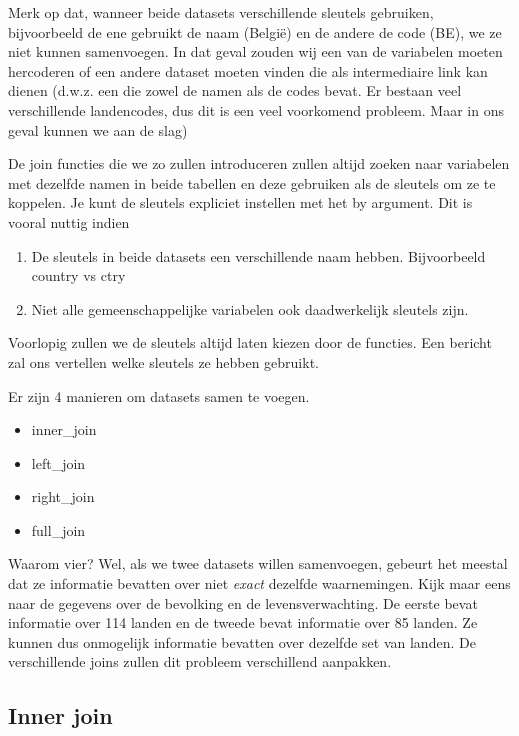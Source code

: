 \documentclass[]{tufte-book}
\providecommand{\tightlist}{%
  \setlength{\itemsep}{0pt}\setlength{\parskip}{0pt}}
\begin{document}
Merk op dat, wanneer beide datasets verschillende sleutels gebruiken, bijvoorbeeld de ene gebruikt de naam (België) en de andere de code (BE), we ze niet kunnen samenvoegen. In dat geval zouden wij een van de variabelen moeten hercoderen of een andere dataset moeten vinden die als intermediaire link kan dienen (d.w.z. een die zowel de namen als de codes bevat. Er bestaan veel verschillende landencodes, dus dit is een veel voorkomend probleem. Maar in ons geval kunnen we aan de slag)

De join functies die we zo zullen introduceren zullen altijd zoeken naar variabelen met dezelfde namen in beide tabellen en deze gebruiken als de sleutels om ze te koppelen. Je kunt de sleutels expliciet instellen met het by argument. Dit is vooral nuttig indien

\begin{enumerate}
\def\labelenumi{\alph{enumi})}
\tightlist
\item
  De sleutels in beide datasets een verschillende naam hebben. Bijvoorbeeld country vs ctry
\item
  Niet alle gemeenschappelijke variabelen ook daadwerkelijk sleutels zijn.
\end{enumerate}

Voorlopig zullen we de sleutels altijd laten kiezen door de functies. Een bericht zal ons vertellen welke sleutels ze hebben gebruikt.

Er zijn 4 manieren om datasets samen te voegen.

\begin{itemize}
\tightlist
\item
  inner\_join
\item
  left\_join
\item
  right\_join
\item
  full\_join
\end{itemize}

Waarom vier? Wel, als we twee datasets willen samenvoegen, gebeurt het meestal dat ze informatie bevatten over niet \emph{exact} dezelfde waarnemingen. Kijk maar eens naar de gegevens over de bevolking en de levensverwachting. De eerste bevat informatie over 114 landen en de tweede bevat informatie over 85 landen. Ze kunnen dus onmogelijk informatie bevatten over dezelfde set van landen. De verschillende joins zullen dit probleem verschillend aanpakken.

\hypertarget{inner-join}{%
\subsection{Inner join}\label{inner-join}}
\end{document}
